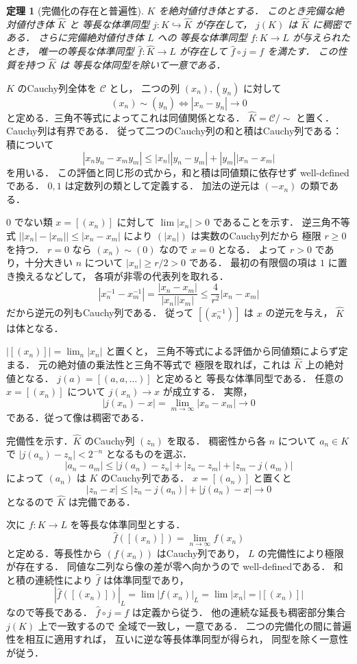 \documentclass[a5paper,10pt,onecolumn]{jsarticle}
\makeatletter
\theoremstyle{mathnotetheorem}
\newtheorem{theorem}{定理}[section]
\renewcommand{\proofname}{証明}
\renewenvironment{proof}[1][\proofname]{%
  \par\pushQED{\qed}\normalfont\topsep4\p@\@plus2\p@\relax
  \trivlist\item[\hskip\labelsep\bfseries #1]\ignorespaces
}{\popQED\endtrivlist\@endpefalse}
\makeatother
\begin{document}
\begin{theorem}[完備化の存在と普遍性]\label{thm:completion}
$K$ を絶対値付き体とする．
このとき完備な絶対値付き体 $\widehat K$ と
等長な体準同型
$j:K\hookrightarrow\widehat K$ が存在して，
$j(K)$ は $\widehat K$ に稠密である．
さらに完備絶対値付き体 $L$ への
等長な体準同型 $f:K\to L$ が与えられたとき，
唯一の等長な体準同型
$\widehat f:\widehat K\to L$ が存在して
$\widehat f\circ j=f$ を満たす．
この性質を持つ $\widehat K$ は
等長な体同型を除いて一意である．
\end{theorem}
\begin{proof}
$K$ のCauchy列全体を $\mathcal C$ とし，
二つの列 $(x_n),(y_n)$ に対して
\[
 (x_n)\sim(y_n)\iff|x_n-y_n|\to0
\]
と定める．三角不等式によってこれは同値関係となる．
$\widehat K=\mathcal C/{\sim}$ と置く．
Cauchy列は有界である．
従って二つのCauchy列の和と積はCauchy列である：
積について
\[
 |x_ny_n-x_my_m|
 \le|x_n||y_n-y_m|+|y_m||x_n-x_m|
\]
を用いる．
この評価と同じ形の式から，和と積は同値類に依存せず
well-definedである．
$0,1$ は定数列の類として定義する．
加法の逆元は $(-x_n)$ の類である．

$0$ でない類 $x=[(x_n)]$ に対して
$\lim|x_n|>0$ であることを示す．
逆三角不等式
$\bigl||x_n|-|x_m|\bigr|\le|x_n-x_m|$
により $(|x_n|)$ は実数のCauchy列だから
極限 $r\ge0$ を持つ．
$r=0$ なら $(x_n)\sim(0)$ なので $x=0$ となる．
よって $r>0$ であり，十分大きい $n$ について
$|x_n|\ge r/2>0$ である．
最初の有限個の項は $1$ に置き換えるなどして，
各項が非零の代表列を取れる．
\[
 |x_n^{-1}-x_m^{-1}|
 =\frac{|x_n-x_m|}{|x_n||x_m|}
 \le\frac4{r^2}|x_n-x_m|
\]
だから逆元の列もCauchy列である．
従って $[(x_n^{-1})]$ は $x$ の逆元を与え，
$\widehat K$ は体となる．

$|[(x_n)]|=\lim_n|x_n|$ と置くと，
三角不等式による評価から同値類によらず定まる．
元の絶対値の乗法性と三角不等式で
極限を取れば，これは $\widehat K$ 上の絶対値となる．
$j(a)=[(a,a,\dots)]$ と定めると
等長な体準同型である．
任意の $x=[(x_n)]$ について
$j(x_n)\to x$ が成立する．
実際，
\[
 |j(x_n)-x|
 =\lim_{m\to\infty}|x_n-x_m|\longrightarrow0
\]
である．従って像は稠密である．

完備性を示す．$\widehat K$ のCauchy列 $(z_n)$ を取る．
稠密性から各 $n$ について
$a_n\in K$ で
$|j(a_n)-z_n|<2^{-n}$ となるものを選ぶ．
\[
 |a_n-a_m|
 \le |j(a_n)-z_n|+|z_n-z_m|+|z_m-j(a_m)|
\]
によって $(a_n)$ は $K$ のCauchy列である．
$x=[(a_n)]$ と置くと
\[
 |z_n-x|\le|z_n-j(a_n)|+|j(a_n)-x|\to0
\]
となるので $\widehat K$ は完備である．

次に $f:K\to L$ を等長な体準同型とする．
\[
 \widehat f([(x_n)])=\lim_{n\to\infty}f(x_n)
\]
と定める．等長性から $(f(x_n))$ はCauchy列であり，
$L$ の完備性により極限が存在する．
同値な二列なら像の差が零へ向かうので
well-definedである．
和と積の連続性により $\widehat f$ は体準同型であり，
\[
 |\widehat f([(x_n)])|_L
 =\lim|f(x_n)|_L=\lim|x_n|
 =|[(x_n)]|
\]
なので等長である．
$\widehat f\circ j=f$ は定義から従う．
他の連続な延長も稠密部分集合 $j(K)$ 上で一致するので
全域で一致し，一意である．
二つの完備化の間に普遍性を相互に適用すれば，
互いに逆な等長体準同型が得られ，
同型を除く一意性が従う．
\end{proof}
\end{document}
